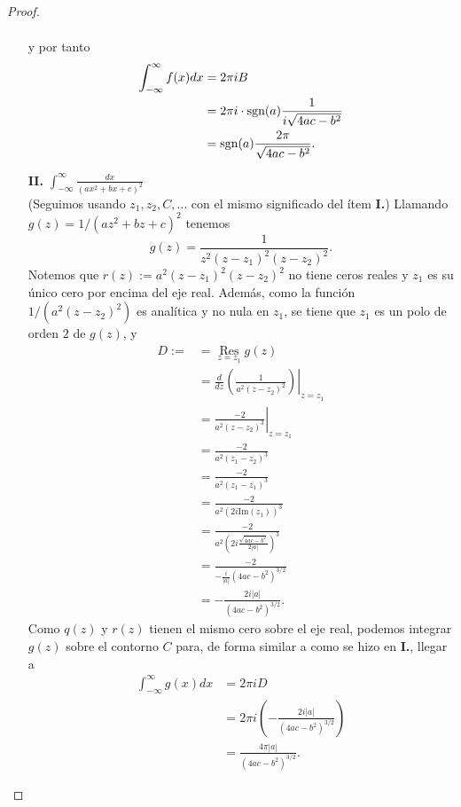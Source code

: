 \begin{proof}
\begin{itemize}
$$\begin{aligned}
         \end{aligned}
         $$
         y por tanto
         $$
         \begin{aligned}
            \int_{-\infty}^{\infty}f(x)dx&=2\pi i B\\
                                         &=2\pi i\cdot\normalfont{\text{sgn}}(a)\frac{1}{i\sqrt{4ac-b^2}}\\
                                         &=\normalfont{\text{sgn}}(a)\frac{2\pi}{\sqrt{4ac-b^2}}.
         \end{aligned}
         $$
      \item[\textbf{II.}] $\int_{-\infty}^{\infty} \frac{dx}{(ax^2+bx+c)^2}$\\
         (Seguimos usando $z_1,z_2,C,\dots$ con el mismo significado del ítem \textbf{I.}) Llamando $g(z)=1/(az^2+bz+c)^2$ tenemos
         $$
         g(z)=\frac{1}{z^2(z-z_1)^2(z-z_2)^2}.
         $$
         Notemos que $r(z):=a^2(z-z_1)^2(z-z_2)^2$ no tiene ceros reales y $z_1$ es su único cero por encima del eje real. Además, como la función $1/(a^2(z-z_2)^2)$ es analítica y no nula en $z_1$, se tiene que $z_1$ es un polo de orden $2$ de $g(z)$, y
         $$
         \begin{aligned}
            D:=&=\mathop{\mathrm{Res}}\limits_{z=z_1}g(z)\\
               &=\frac{d}{dz}\left.\left( \frac{1}{a^2(z-z_2)^2}\right)\right|_{z=z_1}\\
               &=\left. \frac{-2}{a^2(z-z_2)^3}\right|_{z=z_1}\\
               &=\frac{-2}{a^2(z_1-z_2)^3}\\
               &=\frac{-2}{a^2(z_1-\overline{z_1})^3}\\
               &=\frac{-2}{a^2\left( 2i\text{Im}(z_1)\right)^3}\\
               &=\frac{-2}{a^2\left( 2i\frac{\sqrt{4ac-b^2}}{2|a|}\right)^3}\\
               &=\frac{-2}{-\frac{i}{|a|}(4ac-b^2)^{3/2}}\\
               &=-\frac{2i|a|}{(4ac-b^2)^{3/2}}.
         \end{aligned}
         $$
         Como $q(z)$ y $r(z)$ tienen el mismo cero sobre el eje real, podemos integrar $g(z)$ sobre el contorno $C$ para, de forma similar a como se hizo en \textbf{I.}, llegar a
         $$
         \begin{aligned}
            \int_{-\infty}^{\infty}g(x)dx&=2\pi i D\\
                                         &=2\pi i\left( -\frac{2i|a|}{(4ac-b^2)^{3/2}}\right)\\
                                         &=\frac{4\pi|a|}{(4ac-b^2)^{3/2}}.
         \end{aligned}
         $$
   \end{itemize}
\end{proof}
